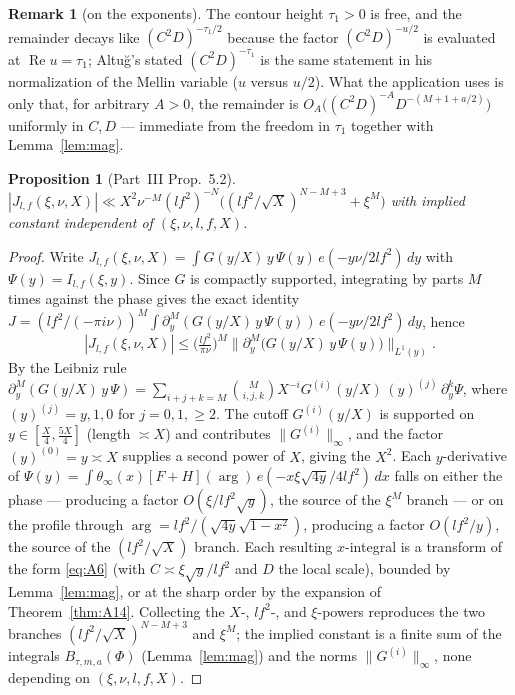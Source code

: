 \documentclass[11pt]{article}
\newtheorem{proposition}[theorem]{Proposition}
\theoremstyle{definition}
\newtheorem{remark}[theorem]{Remark}
\renewcommand{\Re}{\operatorname{Re}}
\begin{document}
\begin{remark}[on the exponents]
The contour height $\tau_1>0$ is free, and the remainder decays like $(C^2D)^{-\tau_1/2}$ because the
factor $(C^2D)^{-u/2}$ is evaluated at $\Re u=\tau_1$; Altu\u{g}'s stated $(C^2D)^{-\tau_1}$ is the same
statement in his normalization of the Mellin variable ($u$ versus $u/2$). What the application uses is
only that, for arbitrary $A>0$, the remainder is $O_A\big((C^2D)^{-A}D^{-(M+1+a/2)}\big)$ uniformly in
$C,D$ --- immediate from the freedom in $\tau_1$ together with Lemma~\ref{lem:mag}.
\end{remark}

\begin{proposition}[Part~III Prop.~5.2]\label{prop:52}
$|J_{l,f}(\xi,\nu,X)|\ll X^2\nu^{-M}(lf^2)^{-N}\big((lf^2/\sqrt X)^{N-M+3}+\xi^M\big)$ with implied
constant independent of $(\xi,\nu,l,f,X)$.
\end{proposition}

\begin{proof}
Write $J_{l,f}(\xi,\nu,X)=\int G(y/X)\,y\,\Psi(y)\,e(-y\nu/2lf^2)\,dy$ with $\Psi(y)=I_{l,f}(\xi,y)$.
Since $G$ is compactly supported, integrating by parts $M$ times against the phase gives the exact
identity $J=(lf^2/(-\pi i\nu))^M\int\partial_y^M(G(y/X)\,y\,\Psi(y))\,e(-y\nu/2lf^2)\,dy$, hence
\[
  |J_{l,f}(\xi,\nu,X)|\le\Big(\tfrac{lf^2}{\pi\nu}\Big)^{M}
    \big\|\partial_y^M\!\big(G(y/X)\,y\,\Psi(y)\big)\big\|_{L^1(y)} .
\]
By the Leibniz rule
$\partial_y^M(G(y/X)\,y\,\Psi)=\sum_{i+j+k=M}\binom{M}{i,j,k}X^{-i}G^{(i)}(y/X)\,(y)^{(j)}\,
\partial_y^k\Psi$, where $(y)^{(j)}=y,1,0$ for $j=0,1,\ge2$. The cutoff $G^{(i)}(y/X)$ is supported on
$y\in[\tfrac X4,\tfrac{5X}4]$ (length $\asymp X$) and contributes $\|G^{(i)}\|_\infty$, and the factor
$(y)^{(0)}=y\asymp X$ supplies a second power of $X$, giving the $X^2$. Each $y$-derivative of
$\Psi(y)=\int\theta_\infty(x)[F+H](\arg)\,e(-x\xi\sqrt{4y}/4lf^2)\,dx$ falls on either the phase ---
producing a factor $O(\xi/lf^2\sqrt y)$, the source of the $\xi^M$ branch --- or on the profile through
$\arg=lf^2/(\sqrt{4y}\sqrt{1-x^2})$, producing a factor $O(lf^2/y)$, the source of the $(lf^2/\sqrt
X)$ branch. Each resulting $x$-integral is a transform of the form \eqref{eq:A6} (with $C\asymp\xi\sqrt
y/lf^2$ and $D$ the local scale), bounded by Lemma~\ref{lem:mag}, or at the sharp order by the
expansion of Theorem~\ref{thm:A14}. Collecting the $X$-, $lf^2$-, and $\xi$-powers reproduces the two
branches $(lf^2/\sqrt X)^{N-M+3}$ and $\xi^M$; the implied constant is a finite sum of the integrals
$B_{\tau,m,a}(\Phi)$ (Lemma~\ref{lem:mag}) and the norms $\|G^{(i)}\|_\infty$, none depending on
$(\xi,\nu,l,f,X)$.
\end{proof}
\end{document}
